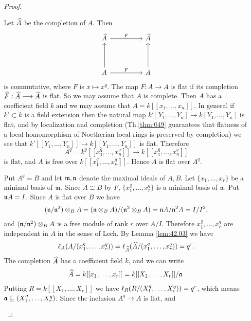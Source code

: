 \documentclass[../main]{subfiles}
\begin{document}
\begin{proof}\phantom{,}
\begin{implyenumerate}
    \item[$(1)\implies(2)$] Let $\widehat{A}$ be the completion of $A$. Then
    \[\begin{tikzcd}
    	{\completion{A}} && {\completion{A}} \\
    	\\
	    A && A
    	\arrow[from=3-3, to=1-3]
    	\arrow[from=3-1, to=1-1]
    	\arrow["F", from=3-1, to=3-3]
    	\arrow["F", from=1-1, to=1-3]
    \end{tikzcd}\]
    is commutative, where $F$ is $x \mapsto x^q$. The map $F: A\longrightarrow A$ is flat if its completion $\widehat{F}: \widehat{A}\longrightarrow \widehat{A}$ is flat. So we may assume that $A$ is complete. Then $A$ has a coefficient field $k$ and we may assume that $A=k[[x_1, \ldots, x_n]]$. In general if $k' \subset k$ is a field extension then the natural map \newline $k'[Y_1, \ldots, Y_n] \longrightarrow k[Y_1, \ldots, Y_n]$ is flat, and by localization and completion (Th.\ref{thm:049} guarantees that flatness of a local homomorphism of Noetherian local rings is preserved by completion) we see that \newline $k'[[Y_1, \ldots, Y_n]]\longrightarrow k[[Y_1, \ldots, Y_n]]$ is flat. Therefore \[A^q=k^q[[x_1^q, \ldots, x_n^q]]\longrightarrow k[[x_1^q, \ldots, x_n^q]]\] is flat, and $A$ is free over $k[[x_1^q, \ldots, x_n^q]]$. Hence $A$ is flat over $A^q$.
    \item[$(3)\implies(1)$] Put $A^q=B$ and let $\mathfrak{m}, \mathfrak{n}$ denote the maximal ideals of $A, B$. Let $\{x_1, \ldots, x_r\}$ be a minimal basis of $\mathfrak{m}$. Since $A \cong B$ by $F$, $\{x_1^q, \ldots, x_r^q\}$ is a minimal basis of $\mathfrak{n}$. Put $\mathfrak{n}A=I$. Since $A$ is flat over $B$ we have \[(\mathfrak{n}/\mathfrak{n}^2)\otimes_B A=(\mathfrak{n}\otimes_B A)/(\mathfrak{n}^2\otimes_B A)=\mathfrak{n}A/\mathfrak{n}^2A=I/I^2,\] and $(\mathfrak{n}/\mathfrak{n}^2)\otimes_B A$ is a free module of rank $r$ over $A/I$. Therefore $x_1^q,\ldots,x_r^q$ are independent in $A$ in the sense of Lech. By Lemma \ref{lem:42.03} we have \[\ell_A(A/(x_1^q,\dots,x_r^q))=\ell_{\widehat{A}}(\widehat{A}/(x_1^q,\dots,x_r^q))=q^r.\] The completion $\widehat{A}$ has a coefficient field $k$, and we can write \[\widehat{A}=k[[x_1,\dots,x_r]]=k[[X_1,\dots,X_r]]/\mathfrak{a}.\] Putting $R=k[[X_1,\dots,X_r]]$ we have $\ell_R(R/(X_1^q,\dots,X_r^q))=q^r$, which means $\mathfrak{a}\subseteq(X_1^q,\dots,X_r^q)$. Since the inclusion $A^q\longrightarrow A$ is flat, and

\end{implyenumerate}
\end{proof}
\end{document}
